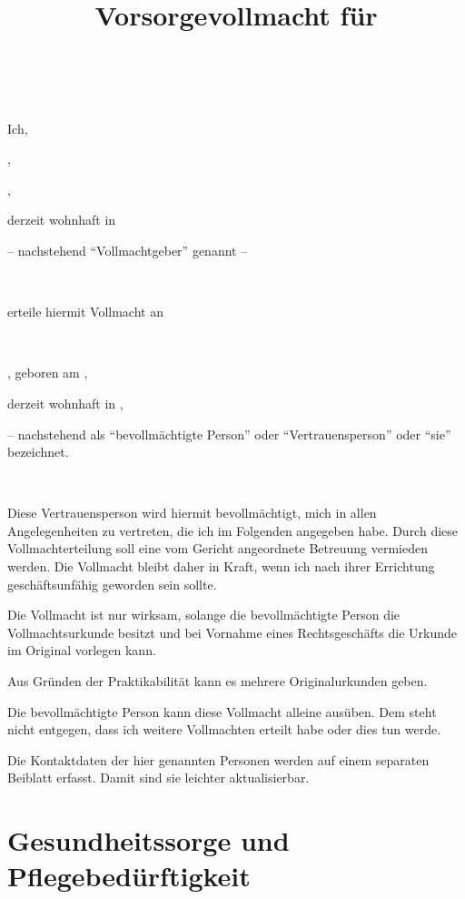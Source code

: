 \documentclass[pdftex,12pt,a4paper]{article}
\author{\myfullname}
\title{Vorsorgevollmacht für \\
       \mytrustedone\\
       }
\date{\dateissued}
\begin{document}



% 



\maketitle
\tableofcontents
\setcounter{page}{1}

\newpage




Ich,

\myfullname,

\mydataofbirth,

derzeit wohnhaft in \myaddress

-- nachstehend \enquote{Vollmachtgeber} genannt -- 

~


erteile hiermit Vollmacht an

~
 
\mytrustedone, geboren am \mytrustedonebirthday,

derzeit wohnhaft in \mytrustedoneaddress,

-- nachstehend als \enquote{bevollmächtigte Person} oder 
\enquote{Vertrauensperson} oder \enquote{sie} bezeichnet.

~

Diese Vertrauensperson wird hiermit bevollmächtigt, mich in allen Angelegenheiten zu vertreten, die ich
im Folgenden angegeben habe. Durch diese Vollmachterteilung soll eine vom Gericht
angeordnete Betreuung vermieden werden. Die Vollmacht bleibt daher in Kraft, wenn ich nach ihrer
Errichtung geschäftsunfähig geworden sein sollte.

Die Vollmacht ist nur wirksam, solange die bevollmächtigte Person die Vollmachtsurkunde besitzt und
bei Vornahme eines Rechtsgeschäfts die Urkunde im Original vorlegen kann.

Aus Gründen der Praktikabilität kann es mehrere Originalurkunden geben.

Die bevollmächtigte Person kann diese Vollmacht alleine ausüben. Dem steht nicht entgegen, dass ich
weitere Vollmachten erteilt habe oder dies tun werde. 

Die Kontaktdaten der hier genannten Personen werden auf einem separaten Beiblatt erfasst. Damit sind sie leichter aktualisierbar.


\section{Gesundheitssorge und Pflegebedürftigkeit}
\end{document}
